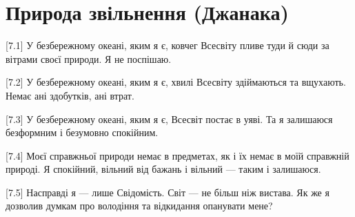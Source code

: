 \chapter[Джанака]{Природа звільнення (Джанака)}

[7.1] У безбережному океані, яким я є, ковчег Всесвіту пливе туди й сюди за вітрами своєї природи. Я не поспішаю.

[7.2] У безбережному океані, яким я є, хвилі Всесвіту здіймаються та вщухають. Немає ані здобутків, ані втрат.

[7.3] У безбережному океані, яким я є, Всесвіт постає в уяві. Та я залишаюся безформним і безумовно спокійним.

[7.4] Моєї справжньої природи немає в предметах, як і їх немає в моїй справжній природі. Я спокійний, вільний від бажань і вільний --- таким і залишаюся.

[7.5] Насправді я --- лише Свідомість. Світ --- не більш ніж вистава. Як же я дозволив думкам про володіння та відкидання опанувати мене?
